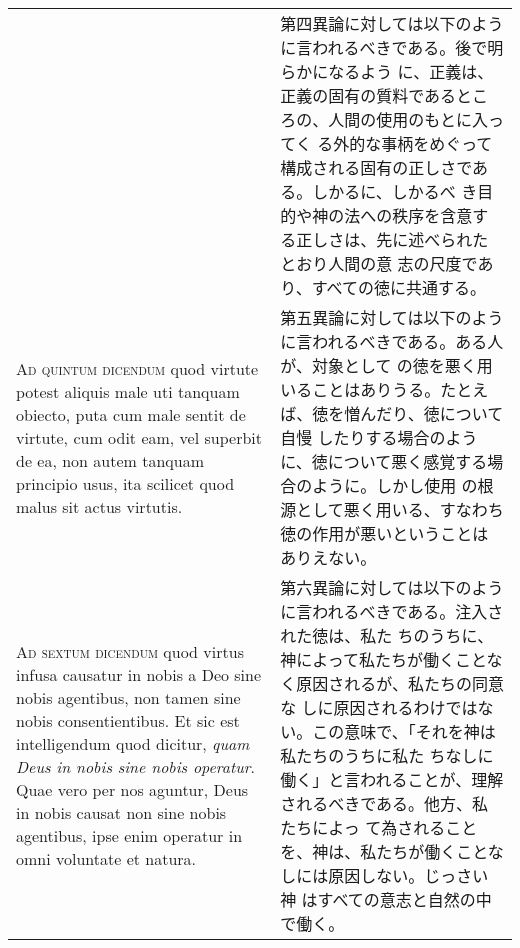 \documentclass[10pt]{jsarticle}
\begin{document}
\begin{longtable}{p{21em}p{21em}}
&

第四異論に対しては以下のように言われるべきである。後で明らかになるよう
に、正義は、正義の固有の質料であるところの、人間の使用のもとに入ってく
る外的な事柄をめぐって構成される固有の正しさである。しかるに、しかるべ
き目的や神の法への秩序を含意する正しさは、先に述べられたとおり人間の意
志の尺度であり、すべての徳に共通する。

\\

{\scshape Ad quintum dicendum} quod virtute potest aliquis male uti
tanquam obiecto, puta cum male sentit de virtute, cum odit eam, vel
superbit de ea, non autem tanquam principio usus, ita scilicet quod
malus sit actus virtutis.

&

第五異論に対しては以下のように言われるべきである。ある人が、対象として
の徳を悪く用いることはありうる。たとえば、徳を憎んだり、徳について自慢
したりする場合のように、徳について悪く感覚する場合のように。しかし使用
の根源として悪く用いる、すなわち徳の作用が悪いということはありえない。

\\

{\scshape Ad sextum dicendum} quod virtus infusa causatur in nobis a
Deo sine nobis agentibus, non tamen sine nobis consentientibus. Et sic
est intelligendum quod dicitur, {\itshape quam Deus in nobis sine
nobis operatur}. Quae vero per nos aguntur, Deus in nobis causat non
sine nobis agentibus, ipse enim operatur in omni voluntate et natura.

&

第六異論に対しては以下のように言われるべきである。注入された徳は、私た
ちのうちに、神によって私たちが働くことなく原因されるが、私たちの同意な
しに原因されるわけではない。この意味で、「それを神は私たちのうちに私た
ちなしに働く」と言われることが、理解されるべきである。他方、私たちによっ
て為されることを、神は、私たちが働くことなしには原因しない。じっさい神
はすべての意志と自然の中で働く。

\end{longtable}
\end{document}
